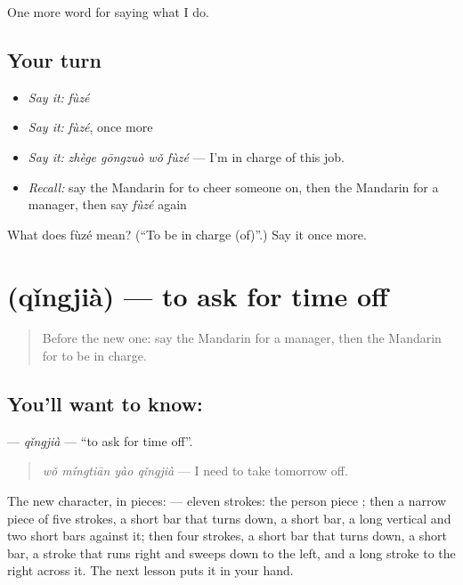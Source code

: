 \begin{grammarlens}[title={What you've built}]
One more word for saying what I do.
\end{grammarlens}

\subsection*{Your turn}
\begin{itemize}
\raggedright
  \item \emph{Say it:} \emph{fùzé}
  \item \emph{Say it:} \emph{fùzé}, once more
  \item \emph{Say it:} \emph{zhège gōngzuò wǒ fùzé} — I'm in charge of this job.
  \item \emph{Recall:} say the Mandarin for to cheer someone on, then the Mandarin for a manager, then say \emph{fùzé} again
\end{itemize}

\begin{tcolorbox}[breakable,colback=teal!4,colframe=teal!35!black,title={Before you move on}]
What does fùzé mean? (\textquotedblleft{}To be in charge (of)\textquotedblright{}.) Say it once more.
\end{tcolorbox}
\section[\texorpdfstring{\zh{请假} (qǐngjià)}{请假 (qǐngjià)}]{ (qǐngjià) — to ask for time off}

\label{lesson:ZH-C263-qingjia}



\begin{quote}
Before the new one: say the Mandarin for a manager, then the Mandarin for to be in charge.
\end{quote}

\subsection*{You'll want to know: }
\textbf{} — \emph{qǐngjià} — \textquotedblleft{}to ask for time off\textquotedblright{}.

\begin{quote}
\textbf{} \emph{wǒ míngtiān yào qǐngjià} — I need to take tomorrow off.
\end{quote}

The new character, in pieces:  — eleven strokes: the person piece ; then a narrow piece of five strokes, a short bar that turns down, a short bar, a long vertical and two short bars against it; then four strokes, a short bar that turns down, a short bar, a stroke that runs right and sweeps down to the left, and a long stroke to the right across it. The next lesson puts it in your hand.

